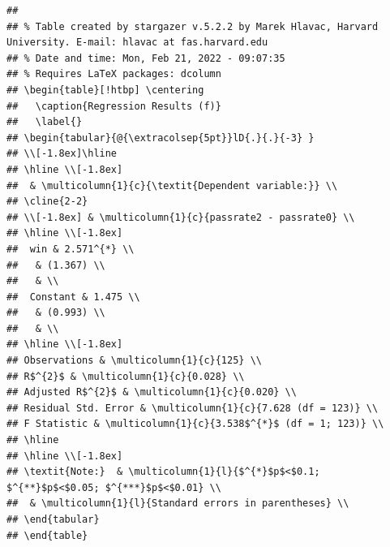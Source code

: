 \documentclass[
  12pt,
  landscape]{article}
\begin{document}
\begin{verbatim}
## 
## % Table created by stargazer v.5.2.2 by Marek Hlavac, Harvard University. E-mail: hlavac at fas.harvard.edu
## % Date and time: Mon, Feb 21, 2022 - 09:07:35
## % Requires LaTeX packages: dcolumn 
## \begin{table}[!htbp] \centering 
##   \caption{Regression Results (f)} 
##   \label{} 
## \begin{tabular}{@{\extracolsep{5pt}}lD{.}{.}{-3} } 
## \\[-1.8ex]\hline 
## \hline \\[-1.8ex] 
##  & \multicolumn{1}{c}{\textit{Dependent variable:}} \\ 
## \cline{2-2} 
## \\[-1.8ex] & \multicolumn{1}{c}{passrate2 - passrate0} \\ 
## \hline \\[-1.8ex] 
##  win & 2.571^{*} \\ 
##   & (1.367) \\ 
##   & \\ 
##  Constant & 1.475 \\ 
##   & (0.993) \\ 
##   & \\ 
## \hline \\[-1.8ex] 
## Observations & \multicolumn{1}{c}{125} \\ 
## R$^{2}$ & \multicolumn{1}{c}{0.028} \\ 
## Adjusted R$^{2}$ & \multicolumn{1}{c}{0.020} \\ 
## Residual Std. Error & \multicolumn{1}{c}{7.628 (df = 123)} \\ 
## F Statistic & \multicolumn{1}{c}{3.538$^{*}$ (df = 1; 123)} \\ 
## \hline 
## \hline \\[-1.8ex] 
## \textit{Note:}  & \multicolumn{1}{l}{$^{*}$p$<$0.1; $^{**}$p$<$0.05; $^{***}$p$<$0.01} \\ 
##  & \multicolumn{1}{l}{Standard errors in parentheses} \\ 
## \end{tabular} 
## \end{table}
\end{verbatim}
\end{document}
